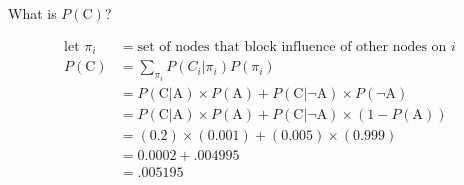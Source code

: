 \documentclass[12pt]{article}
\begin{document}
\begin{enumerate}
\vspace{-2em}

What is $P(\text{C})$?\\

\vspace{-3em}

\begin{align*}
\text{let } \pi_i &= \text{set of nodes that block influence of other nodes on } i\\
        P(\text{C}) &= \sum_{\pi_i} P(C_i|\pi_i)P(\pi_i)\\
        &= P(\text{C}|\text{A}) \times P(\text{A}) + P(\text{C}|\neg\text{A}) \times P(\neg\text{A})\\
        &= P(\text{C}|\text{A}) \times P(\text{A}) + P(\text{C}|\neg\text{A}) \times (1 - P(\text{A}))\\
        &= (0.2) \times (0.001) + (0.005) \times (0.999)\\
        &= 0.0002 + .004995\\
        &= \boxed{.005195}
\end{align*}

\end{enumerate}
\end{document}
